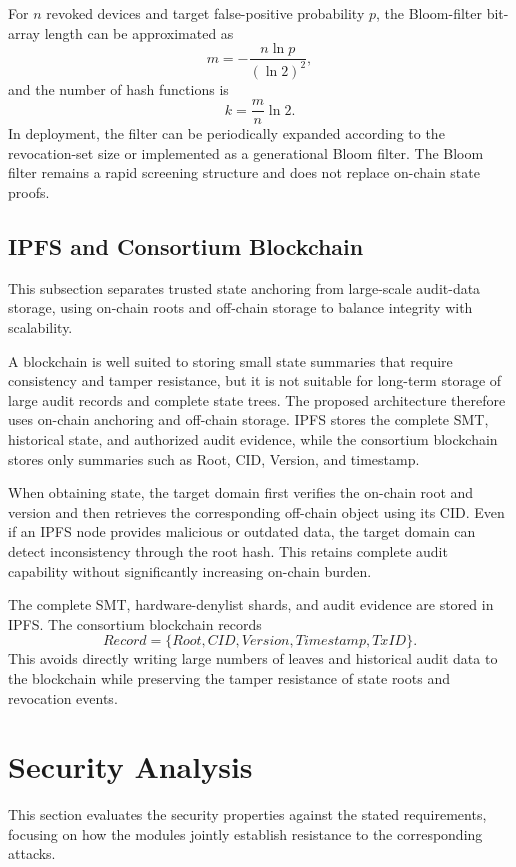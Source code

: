 \documentclass[lettersize,journal]{IEEEtran}
\begin{document}
	For $n$ revoked devices and target false-positive probability $p$, the Bloom-filter bit-array length can be approximated as
	\begin{equation}
		m=-\frac{n\ln p}{(\ln2)^2},
	\end{equation}
	and the number of hash functions is
	\begin{equation}
		k=\frac{m}{n}\ln2.
	\end{equation}
	In deployment, the filter can be periodically expanded according to the revocation-set size or implemented as a generational Bloom filter. The Bloom filter remains a rapid screening structure and does not replace on-chain state proofs.
	
	\subsection{IPFS and Consortium Blockchain}
	This subsection separates trusted state anchoring from large-scale audit-data storage, using on-chain roots and off-chain storage to balance integrity with scalability.
	
	
	A blockchain is well suited to storing small state summaries that require consistency and tamper resistance, but it is not suitable for long-term storage of large audit records and complete state trees. The proposed architecture therefore uses on-chain anchoring and off-chain storage. IPFS stores the complete SMT, historical state, and authorized audit evidence, while the consortium blockchain stores only summaries such as Root, CID, Version, and timestamp.
	
	When obtaining state, the target domain first verifies the on-chain root and version and then retrieves the corresponding off-chain object using its CID. Even if an IPFS node provides malicious or outdated data, the target domain can detect inconsistency through the root hash. This retains complete audit capability without significantly increasing on-chain burden.
	
	The complete SMT, hardware-denylist shards, and audit evidence are stored in IPFS. The consortium blockchain records
	\begin{equation}
		Record=\{Root,CID,Version,Timestamp,TxID\}.
	\end{equation}
	This avoids directly writing large numbers of leaves and historical audit data to the blockchain while preserving the tamper resistance of state roots and revocation events.
	
	\section{Security Analysis}
	This section evaluates the security properties against the stated requirements, focusing on how the modules jointly establish resistance to the corresponding attacks.
	
\end{document}
